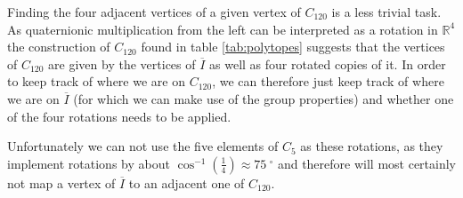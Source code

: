 Finding the four adjacent vertices of a given vertex of $C_{120}$ is a less trivial task. As quaternionic multiplication from the left can be interpreted as a rotation in $\mathbb{R}^4$ the construction of $C_{120}$ found in table \ref{tab:polytopes} suggests that the vertices of $C_{120}$ are given by the vertices of $\overline{I}$ as well as four rotated copies of it. In order to keep track of where we are on $C_{120}$, we can therefore just keep track of where we are on $\overline{I}$ (for which we can make use of the group properties) and whether one of the four rotations needs to be applied.

Unfortunately we can not use the five elements of $C_5$ as these rotations, as they implement rotations by about $\cos^{-1}\left({\frac{1}{4}}\right) \approx \SI{75}{^\circ}$ and therefore will most certainly not map a vertex of $\overline{I}$ to an adjacent one of $C_{120}$.


